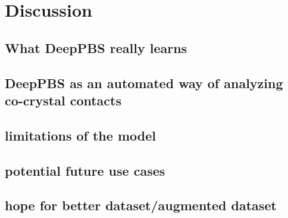 \section{Discussion}

\subsection{What DeepPBS really learns}

\subsection{DeepPBS as an automated way of analyzing co-crystal contacts}
\subsection{limitations of the model}

\subsection{potential future use cases}

\subsection{hope for better dataset/augmented dataset}

